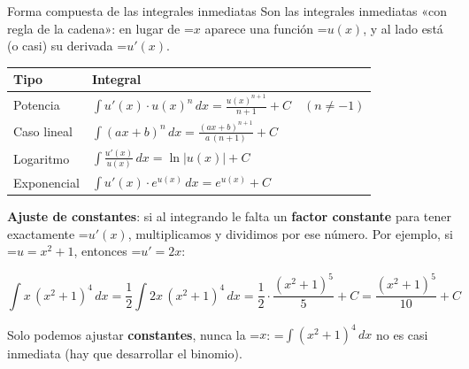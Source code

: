 \documentclass[11pt,a4paper]{article}
\newcommand{\fmm}[1]{\setbox0=\hbox{$#1$}\ifdim\wd0>\linewidth\[#1\]\else\mbox{\box0}\fi}
\newcommand{\fmuline}[1]{\textbf{\color{fmaccent}#1}}
\begin{document}
  
\begin{fmdef}{Forma compuesta de las integrales inmediatas}
Son las integrales inmediatas «con regla de la cadena»: en lugar de \fmm{x} aparece una función \fmm{u(x)}, y al lado está (o casi) su derivada \fmm{u'(x)}.

      
\begin{center}\renewcommand{\arraystretch}{2.3}\small\begin{tabularx}{\linewidth}{>{\raggedright\arraybackslash}p{3.2cm}>{\centering\arraybackslash}X}\toprule
\textbf{Tipo} & \textbf{Integral}\\\midrule
Potencia & $\displaystyle\int u'(x)\cdot u(x)^n\,dx=\frac{u(x)^{n+1}}{n+1}+C\quad(n\neq-1)$\\[3pt]
Caso lineal & $\displaystyle\int(ax+b)^n\,dx=\frac{(ax+b)^{n+1}}{a\,(n+1)}+C$\\[3pt]
Logaritmo & $\displaystyle\int\frac{u'(x)}{u(x)}\,dx=\ln|u(x)|+C$\\[3pt]
Exponencial & $\displaystyle\int u'(x)\cdot e^{u(x)}\,dx=e^{u(x)}+C$\\[3pt]
\bottomrule\end{tabularx}\end{center}

      

\fmuline{Ajuste de constantes}: si al integrando le falta un \textbf{factor constante} para tener exactamente \fmm{u'(x)}, multiplicamos y dividimos por ese número. Por ejemplo, si \fmm{u=x^2+1}, entonces \fmm{u'=2x}:

      
\[\int x\,(x^2+1)^4\,dx=\frac12\int 2x\,(x^2+1)^4\,dx=\frac12\cdot\frac{(x^2+1)^5}{5}+C=\frac{(x^2+1)^5}{10}+C\]

      
\begin{fmnote}Solo podemos ajustar \textbf{constantes}, nunca la \fmm{x}: \fmm{\int(x^2+1)^4\,dx} no es casi inmediata (hay que desarrollar el binomio).\end{fmnote}
\end{fmdef}
\end{document}
